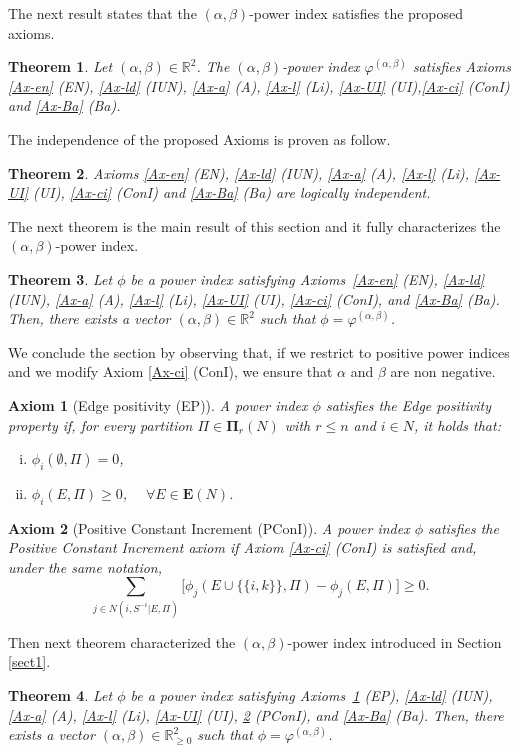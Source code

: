 \documentclass[preprint,11pt,authoryear]{elsarticle}
\theoremstyle{plain}
\newtheorem{theorem}{Theorem}[]
\newtheorem{axiom}{Axiom}
\begin{document}
The next result states that the $(\alpha,\beta)$-power index satisfies the proposed axioms.
\begin{theorem}\label{teo:suff}
Let $(\alpha,\beta)\in\mathbb{R}^2$. The $(\alpha,\beta)$-power index $\varphi^{(\alpha,\beta)}$ satisfies Axioms \ref{Ax-en} (EN), \ref{Ax-ld} (IUN), \ref{Ax-a} (A), \ref{Ax-l} (Li), \ref{Ax-UI} (UI),\ref{Ax-ci} (ConI) and \ref{Ax-Ba} (Ba).
\end{theorem}
The independence of the proposed Axioms is proven as follow.
\begin{theorem}\label{indipendence}
Axioms \ref{Ax-en} (EN), \ref{Ax-ld} (IUN), \ref{Ax-a} (A), \ref{Ax-l} (Li), \ref{Ax-UI} (UI), \ref{Ax-ci} (ConI) and \ref{Ax-Ba} (Ba) are logically independent.   \end{theorem}
The next theorem is the main result of this section and it fully characterizes the $(\alpha,\beta)$-power index.
\begin{theorem}\label{main}
Let $\phi$ be a power index satisfying Axioms~\ref{Ax-en} (EN), \ref{Ax-ld} (IUN), \ref{Ax-a} (A), \ref{Ax-l} (Li), \ref{Ax-UI} (UI), \ref{Ax-ci} (ConI), and \ref{Ax-Ba} (Ba). Then, there exists a vector $(\alpha,\beta) \in \mathbb{R}^2$ such that $\phi = \varphi^{(\alpha,\beta)}$.
\end{theorem}


We conclude the section by observing that, if we restrict to positive power indices and we modify Axiom \ref{Ax-ci} (ConI), we ensure that $\alpha$ and $\beta$ are non negative. 

\begin{axiom}[Edge positivity (EP)]\label{Ax-pen}
A power index $\phi$ satisfies the \emph{Edge positivity} property if, for every partition 
$\Pi \in \mathbf{\Pi}_r(N)$ with $r \leq n$ and $i\in N$, it holds that:
\begin{enumerate}[(i)]
    \item $\phi_i(\emptyset, \Pi) = 0$,
    \item $\phi_i(E,\Pi)\geq 0$, $\quad\forall E\in\mathbf{E}(N)$. 
\end{enumerate}
\end{axiom}
\begin{axiom}[Positive Constant Increment (PConI)]\label{Ax-pci}
A power index $\phi$ satisfies the \emph{Positive Constant Increment} axiom 
if Axiom \ref{Ax-ci} (ConI) is satisfied and, under the same notation, 
\[
\sum_{j \in N(i, S^{-i}| E, \Pi)} \big[ \phi_j(E \cup \{\{i,k\}\}, \Pi) - \phi_j(E, \Pi) \big]
\geq0.
\]
\end{axiom}
Then next theorem characterized the $(\alpha,\beta)$-power index introduced in Section \ref{sect1}. 
\begin{theorem}\label{mainp}
Let $\phi$ be a power index satisfying Axioms~\ref{Ax-pen} (EP), \ref{Ax-ld} (IUN), \ref{Ax-a} (A), \ref{Ax-l} (Li), \ref{Ax-UI} (UI), \ref{Ax-pci} (PConI), and \ref{Ax-Ba} (Ba). Then, there exists a vector $(\alpha,\beta) \in \mathbb{R}^2_{\geq 0}$ such that $\phi = \varphi^{(\alpha,\beta)}$.
\end{theorem}
\end{document}
